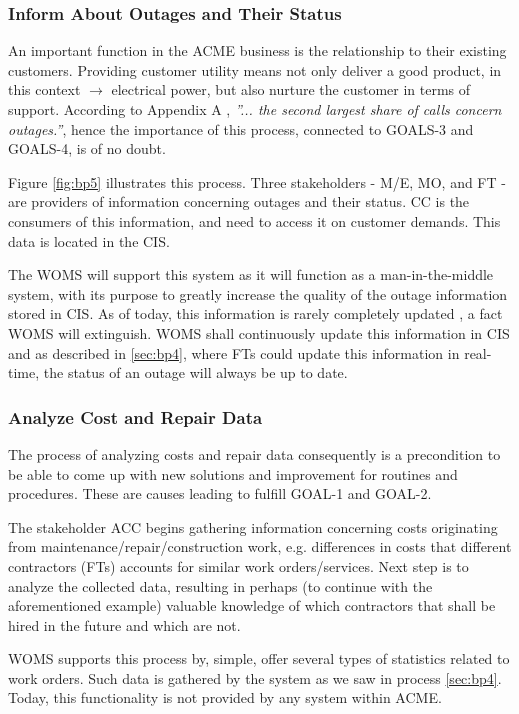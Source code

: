 \subsubsection{Inform About Outages and Their Status}
\label{bp5}
An important function in the ACME business is the relationship to their existing customers. Providing customer utility means not only deliver a good product, in this context $\rightarrow$ electrical power, but also nurture the customer in terms of support. According to Appendix A \cite{appendixA}, \emph{''... the second largest share of calls concern outages.''}, hence the importance of this process, connected to GOALS-3 and GOALS-4, is of no doubt. 

Figure \ref{fig:bp5} illustrates this process. Three stakeholders - M/E, MO, and FT - are providers of information concerning outages and their status. CC is the consumers of this information, and need to access it on customer demands. This data is located in the CIS.

The WOMS will support this system as it will function as a man-in-the-middle system, with its purpose to greatly increase the quality of the outage information stored in CIS. As of today, this information is rarely completely updated \cite{appendixA}, a fact WOMS will extinguish. WOMS shall continuously update this information in CIS and as described in \ref{sec:bp4}, where FTs could update this information in real-time, the status of an outage will always be up to date. 

\subsubsection{Analyze Cost and Repair Data}
\label{bp6}
The process of analyzing costs and repair data consequently is a precondition to be able to come up with new solutions and improvement for routines and procedures. These are causes leading to fulfill GOAL-1 and GOAL-2. 

The stakeholder ACC begins gathering information concerning costs originating from maintenance/repair/construction work, e.g. differences in costs that different contractors (FTs) accounts for similar work orders/services.  Next step is to analyze the collected data, resulting in perhaps (to continue with the aforementioned example) valuable knowledge of which contractors that shall be hired in the future and which are not. 

WOMS supports this process by, simple, offer several types of statistics related to work orders. Such data is gathered by the system as we saw in process \ref{sec:bp4}. Today, this functionality is not provided by any system within ACME.
